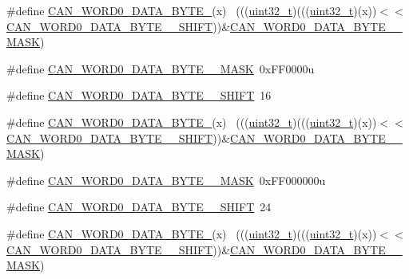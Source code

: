 \begin{DoxyCompactItemize}
\item 
\#define \hyperlink{group___c_a_n___register___masks_ga5df0dc90a87f1354757ab4c058343ea0}{C\+A\+N\+\_\+\+W\+O\+R\+D0\+\_\+\+D\+A\+T\+A\+\_\+\+B\+Y\+T\+E\+\_}(x)                              ~(((\hyperlink{_p_e___types_8h_a33594304e786b158f3fb30289278f5af}{uint32\+\_\+t})(((\hyperlink{_p_e___types_8h_a33594304e786b158f3fb30289278f5af}{uint32\+\_\+t})(x))$<$$<$\hyperlink{group___c_a_n___register___masks_ga30489eaec721b5f42b721c65d8c0cf67}{C\+A\+N\+\_\+\+W\+O\+R\+D0\+\_\+\+D\+A\+T\+A\+\_\+\+B\+Y\+T\+E\+\_\+\_\+\+S\+H\+I\+FT}))\&\hyperlink{group___c_a_n___register___masks_gaf5ac3a0da0156c6c331ae39e688d1a6b}{C\+A\+N\+\_\+\+W\+O\+R\+D0\+\_\+\+D\+A\+T\+A\+\_\+\+B\+Y\+T\+E\+\_\+\_\+\+M\+A\+SK})
\item 
\#define \hyperlink{group___c_a_n___register___masks_ga9e7f294cbdc5772dc2de56ec615eb695}{C\+A\+N\+\_\+\+W\+O\+R\+D0\+\_\+\+D\+A\+T\+A\+\_\+\+B\+Y\+T\+E\+\_\+\_\+\+M\+A\+SK}~0x\+F\+F0000u
\item 
\#define \hyperlink{group___c_a_n___register___masks_ga93129c7dd5f1db1583bf5110179d7a4e}{C\+A\+N\+\_\+\+W\+O\+R\+D0\+\_\+\+D\+A\+T\+A\+\_\+\+B\+Y\+T\+E\+\_\+\_\+\+S\+H\+I\+FT}~16
\item 
\#define \hyperlink{group___c_a_n___register___masks_ga2ec9434e1f8983ec432f20519935e9d1}{C\+A\+N\+\_\+\+W\+O\+R\+D0\+\_\+\+D\+A\+T\+A\+\_\+\+B\+Y\+T\+E\+\_}(x)                              ~(((\hyperlink{_p_e___types_8h_a33594304e786b158f3fb30289278f5af}{uint32\+\_\+t})(((\hyperlink{_p_e___types_8h_a33594304e786b158f3fb30289278f5af}{uint32\+\_\+t})(x))$<$$<$\hyperlink{group___c_a_n___register___masks_ga93129c7dd5f1db1583bf5110179d7a4e}{C\+A\+N\+\_\+\+W\+O\+R\+D0\+\_\+\+D\+A\+T\+A\+\_\+\+B\+Y\+T\+E\+\_\+\_\+\+S\+H\+I\+FT}))\&\hyperlink{group___c_a_n___register___masks_ga9e7f294cbdc5772dc2de56ec615eb695}{C\+A\+N\+\_\+\+W\+O\+R\+D0\+\_\+\+D\+A\+T\+A\+\_\+\+B\+Y\+T\+E\+\_\+\_\+\+M\+A\+SK})
\item 
\#define \hyperlink{group___c_a_n___register___masks_ga850d4e3257b02cacead5d9e2b757818c}{C\+A\+N\+\_\+\+W\+O\+R\+D0\+\_\+\+D\+A\+T\+A\+\_\+\+B\+Y\+T\+E\+\_\+\_\+\+M\+A\+SK}~0x\+F\+F000000u
\item 
\#define \hyperlink{group___c_a_n___register___masks_gaf84582fa0ea01d047081e02025634145}{C\+A\+N\+\_\+\+W\+O\+R\+D0\+\_\+\+D\+A\+T\+A\+\_\+\+B\+Y\+T\+E\+\_\+\_\+\+S\+H\+I\+FT}~24
\item 
\#define \hyperlink{group___c_a_n___register___masks_ga9490e4d0519b4213fd46de41c417f90f}{C\+A\+N\+\_\+\+W\+O\+R\+D0\+\_\+\+D\+A\+T\+A\+\_\+\+B\+Y\+T\+E\+\_}(x)                              ~(((\hyperlink{_p_e___types_8h_a33594304e786b158f3fb30289278f5af}{uint32\+\_\+t})(((\hyperlink{_p_e___types_8h_a33594304e786b158f3fb30289278f5af}{uint32\+\_\+t})(x))$<$$<$\hyperlink{group___c_a_n___register___masks_gaf84582fa0ea01d047081e02025634145}{C\+A\+N\+\_\+\+W\+O\+R\+D0\+\_\+\+D\+A\+T\+A\+\_\+\+B\+Y\+T\+E\+\_\+\_\+\+S\+H\+I\+FT}))\&\hyperlink{group___c_a_n___register___masks_ga850d4e3257b02cacead5d9e2b757818c}{C\+A\+N\+\_\+\+W\+O\+R\+D0\+\_\+\+D\+A\+T\+A\+\_\+\+B\+Y\+T\+E\+\_\+\_\+\+M\+A\+SK})
$$
\end{DoxyCompactItemize}
